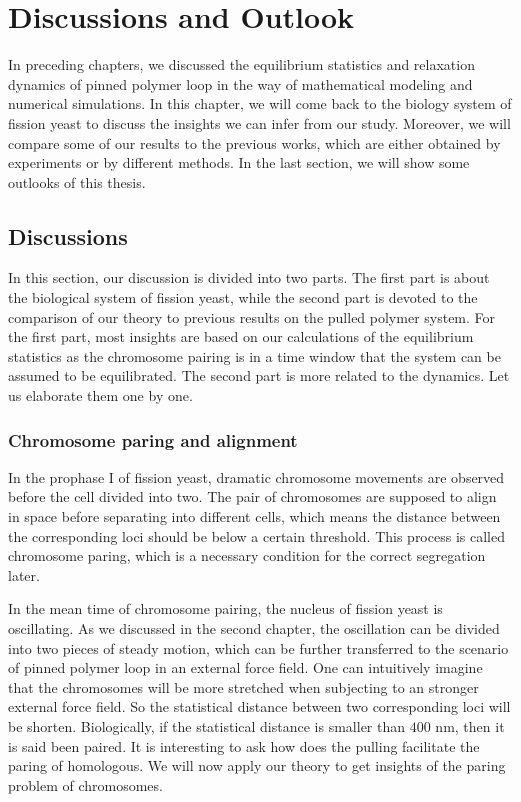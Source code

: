 \chapter{Discussions and Outlook}  
\graphicspath{{Chapter5/Figs/}}

In preceding chapters, we discussed the equilibrium statistics and relaxation dynamics of pinned polymer loop in the way of mathematical modeling and numerical simulations. In this chapter, we will come back to the biology system of fission yeast to discuss the insights we can infer from our study. Moreover, we will compare some of our results to the previous works, which are either obtained by experiments or by different methods. In the last section, we will show some outlooks of this thesis. 

\section{Discussions}
\label{sec:Discussions}

In this section, our discussion is divided into two parts. The first part is about the biological system of fission yeast, while the second part is devoted to the comparison of our theory to previous results on the pulled polymer system. For the first part, most insights are based on our calculations of the equilibrium statistics as the chromosome pairing is in a time window that the system can be assumed to be equilibrated. The second part is more related to the dynamics. Let us elaborate them one by one. 

\subsection{Chromosome paring and alignment}
\label{sub:chromosome_paring_and_alignment}

In the prophase I of fission yeast, dramatic chromosome movements are observed before the cell divided into two. The pair of chromosomes are supposed to align in space before separating into different cells, which means the distance between the corresponding loci should be below a certain threshold. This process is called chromosome paring, which is a necessary condition for the correct segregation later.

In the mean time of chromosome pairing, the nucleus of fission yeast is oscillating. As we discussed in the second chapter, the oscillation can be divided into two pieces of steady motion, which can be further transferred to the scenario of pinned polymer loop in an external force field. One can intuitively imagine that the chromosomes will be more stretched when subjecting to an stronger external force field. So the statistical distance between two corresponding loci will be shorten. Biologically, if the statistical distance is smaller than $400$ nm, then it is said been paired. It is interesting to ask how does the pulling facilitate the paring of homologous. 
We will now apply our theory to get insights of the paring problem of chromosomes. 


